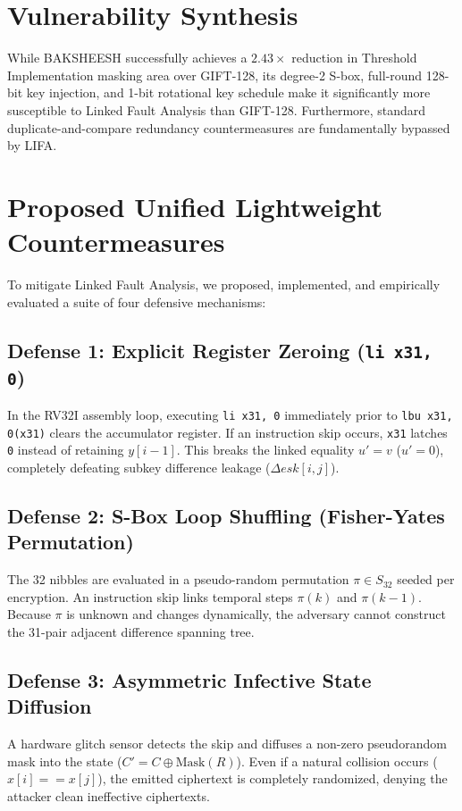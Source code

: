 \documentclass[12pt,a4paper,oneside]{report}
\begin{document}
\section{Vulnerability Synthesis}
\label{sec:synth}
While BAKSHEESH successfully achieves a $2.43\times$ reduction in Threshold Implementation masking area over GIFT-128, its degree-2 S-box, full-round 128-bit key injection, and 1-bit rotational key schedule make it significantly more susceptible to Linked Fault Analysis than GIFT-128. Furthermore, standard duplicate-and-compare redundancy countermeasures are fundamentally bypassed by LIFA.

\section{Proposed Unified Lightweight Countermeasures}
\label{sec:proposed_countermeasures}
To mitigate Linked Fault Analysis, we proposed, implemented, and empirically evaluated a suite of four defensive mechanisms:

\subsection{Defense 1: Explicit Register Zeroing (\texttt{li x31, 0})}
In the RV32I assembly loop, executing \texttt{li x31, 0} immediately prior to \texttt{lbu x31, 0(x31)} clears the accumulator register. If an instruction skip occurs, \texttt{x31} latches \texttt{0} instead of retaining $y[i-1]$. This breaks the linked equality $u' = v$ ($u' = 0$), completely defeating subkey difference leakage ($\Delta esk[i, j]$).

\subsection{Defense 2: S-Box Loop Shuffling (Fisher-Yates Permutation)}
The 32 nibbles are evaluated in a pseudo-random permutation $\pi \in S_{32}$ seeded per encryption. An instruction skip links temporal steps $\pi(k)$ and $\pi(k-1)$. Because $\pi$ is unknown and changes dynamically, the adversary cannot construct the 31-pair adjacent difference spanning tree.

\subsection{Defense 3: Asymmetric Infective State Diffusion}
A hardware glitch sensor detects the skip and diffuses a non-zero pseudorandom mask into the state ($C' = C \oplus \text{Mask}(R)$). Even if a natural collision occurs ($x[i] == x[j]$), the emitted ciphertext is completely randomized, denying the attacker clean ineffective ciphertexts.
\end{document}
